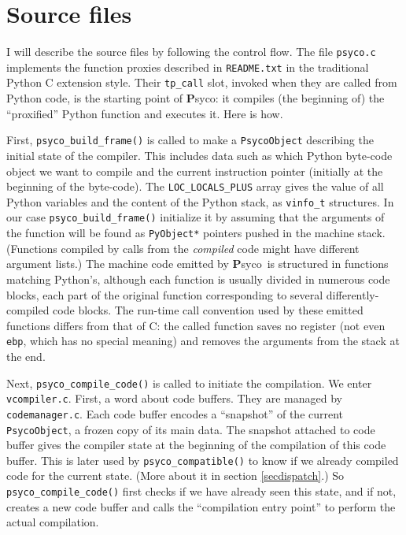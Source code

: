 \documentclass{article}
\def\Psyco{{\bf P}syco}
\def\code#1{\texttt{#1}}
\begin{document}
\section{Source files}


I will describe the source files by following the control flow. The file \code{psyco.c} implements the function proxies described in \code{README.txt} in the traditional Python C extension style. Their \code{tp_call} slot, invoked when they are called from Python code, is the starting point of \Psyco: it compiles (the beginning of) the ``proxified'' Python function and executes it. Here is how.

First, \code{psyco_build_frame()} is called to make a \code{PsycoObject} describing the initial state of the compiler. This includes data such as which Python byte-code object we want to compile and the current instruction pointer (initially at the beginning of the byte-code). The \code{LOC_LOCALS_PLUS} array gives the value of all Python variables and the content of the Python stack, as \code{vinfo_t} structures. In our case \code{psyco_build_frame()} initialize it by assuming that the arguments of the function will be found as \code{PyObject*} pointers pushed in the machine stack. (Functions compiled by calls from the \emph{compiled} code might have different argument lists.) The machine code emitted by \Psyco\ is structured in functions matching Python's, although each function is usually divided in numerous code blocks, each part of the original function corresponding to several differently-compiled code blocks. The run-time call convention used by these emitted functions differs from that of C: the called function saves no register (not even \code{ebp}, which has no special meaning) and removes the arguments from the stack at the end.

Next, \code{psyco_compile_code()} is called to initiate the compilation. We enter \code{vcompiler.c}. First, a word about code buffers. They are managed by \code{codemanager.c}. Each code buffer encodes a ``snapshot'' of the current \code{PsycoObject}, a frozen copy of its main data. The snapshot attached to code buffer gives the compiler state at the beginning of the compilation of this code buffer. This is later used by \code{psyco_compatible()} to know if we already compiled code for the current state. (More about it in section \ref{secdispatch}.) So \code{psyco_compile_code()} first checks if we have already seen this state, and if not, creates a new code buffer and calls the ``compilation entry point'' to perform the actual compilation.
\end{document}
